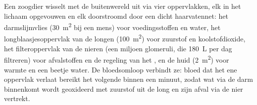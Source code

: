 \begin{proposition}\label{prop:b1:mammal-organization:surfaces}
Een zoogdier wisselt met de buitenwereld uit via vier oppervlakken, elk in het
lichaam opgevouwen en elk doorstroomd door een dicht haarvatennet: het
darmslijmvlies (\qty{30}{m^2} bij een mens) voor voedingsstoffen en water, het
longblaasjesoppervlak van de longen (\qty{100}{m^2}) voor zuurstof en
koolstofdioxide, het filteroppervlak van de nieren (een miljoen glomeruli, die
\qty{180}{L}  per dag filtreren) voor afvalstoffen en de regeling van het
, en de huid (\qty{2}{m^2}) voor warmte en een beetje water. De
bloedsomloop verbindt ze: bloed dat het ene oppervlak verlaat bereikt het
volgende binnen een minuut, zodat wat via de darm binnenkomt wordt geoxideerd
met zuurstof uit de long en zijn afval via de nier vertrekt.
\end{proposition}

